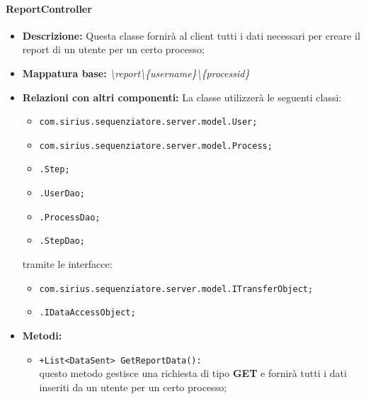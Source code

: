\paragraph{ReportController}%
\begin{itemize}
	\item \textbf{Descrizione: } Questa classe fornirà al client tutti i dati necessari per creare il report di un utente per un certo processo;
	\item \textbf{Mappatura base: } \textit{\textbackslash report\textbackslash \{username\}\textbackslash \{processid\}}
	\item \textbf{Relazioni con altri componenti: }
	La classe utilizzerà le seguenti classi:
	\begin{itemize}
		\item \texttt{com.sirius.sequenziatore.server.model.User;}
		\item \texttt{com.sirius.sequenziatore.server.model.Process;}
		\item \texttt{\sModel .Step;}
		\item \texttt{\sModel .UserDao;}
		\item \texttt{\sModel .ProcessDao;}
		\item \texttt{\sModel .StepDao;}
		
	\end{itemize}
	tramite le interfacce:
	\begin{itemize}
		\item \texttt{com.sirius.sequenziatore.server.model.ITransferObject;}
		\item \texttt{\sModel .IDataAccessObject;}
	\end{itemize}
	\item \textbf{Metodi: }\begin{itemize}
					\item \texttt{+List<DataSent> GetReportData():}\\
					questo metodo gestisce una richiesta di tipo \textbf{GET} e fornirà tutti i dati inseriti da un utente per un certo processo;
				\end{itemize}
\end{itemize}